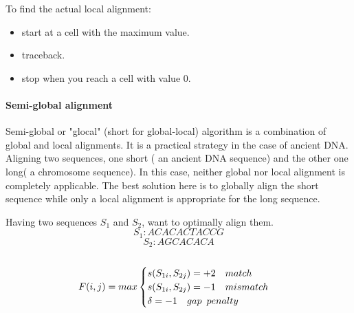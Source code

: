 \documentclass[11pt,a4paper]{report}
\begin{document}
To find the actual local alignment:
\begin{itemize}
 \item start at a cell with the maximum value.
 \item traceback.
 \item stop when you reach a cell with value 0.
\end{itemize} 



\paragraph{Semi-global alignment}

Semi-global or "glocal" (short for global-local) algorithm is a combination of global
and local alignments. 
It is a practical strategy in the case of ancient DNA.
Aligning two sequences, one short ( an ancient DNA sequence) and the 
other one long( a chromosome sequence). In this case, neither global 
nor local alignment is completely applicable. The best solution here is to globally 
align the short sequence while only a local alignment is appropriate for the long sequence.


Having two sequences  $S_{1}$ and $S_{2}$, want to optimally align them.
$$S_{1}:ACACACTACCG$$
$$S_{2}:AGCACACA$$\\

\[ F(i,j)= max
\begin{cases}
   s(S_{1i},S_{2j})= +2 \quad match \\
   s(S_{1i},S_{2j})= -1 \quad mismatch \\
  \delta = -1  \quad gap \enskip  penalty \\ 
\end{cases}
\] \\
\end{document}
